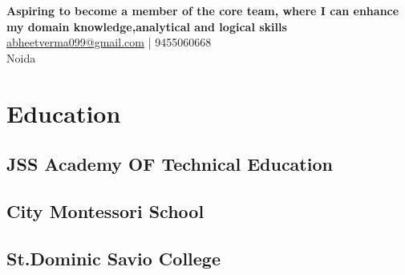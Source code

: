\documentclass[]{resume-openfont}
\begin{document}
%
%
\lastupdated

%
%


{
\textbf{Aspiring to become a member of the core team, where I can enhance my domain knowledge,analytical and logical skills}
 \\
\href{mailto:abheetverma099@gmail.com}{abheetverma099@gmail.com} | 9455060668\\Noida
}

%
%

\begin{minipage}[t]{0.33\textwidth} 


\section{Education} 

\subsection{JSS Academy OF Technical Education}
\sectionsep



\subsection{City Montessori School}
\sectionsep

\subsection{St.Dominic Savio College}
\sectionsep



\end{minipage}
\end{document}
